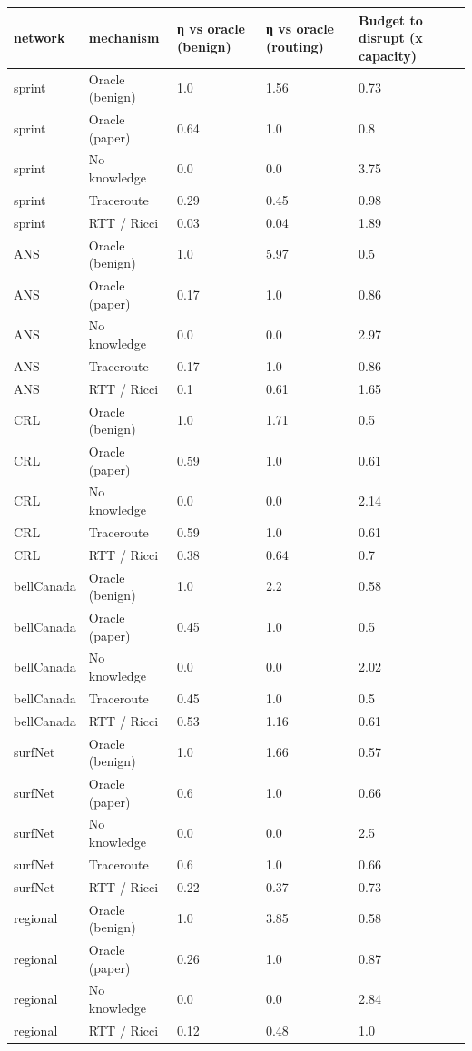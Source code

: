 \begin{tabular}{lllll}
\toprule
network & mechanism & η vs oracle (benign) & η vs oracle (routing) & Budget to disrupt (x capacity) \\
\midrule
sprint & Oracle (benign) & 1.0 & 1.56 & 0.73 \\
sprint & Oracle (paper) & 0.64 & 1.0 & 0.8 \\
sprint & No knowledge & 0.0 & 0.0 & 3.75 \\
sprint & Traceroute & 0.29 & 0.45 & 0.98 \\
sprint & RTT / Ricci & 0.03 & 0.04 & 1.89 \\
ANS & Oracle (benign) & 1.0 & 5.97 & 0.5 \\
ANS & Oracle (paper) & 0.17 & 1.0 & 0.86 \\
ANS & No knowledge & 0.0 & 0.0 & 2.97 \\
ANS & Traceroute & 0.17 & 1.0 & 0.86 \\
ANS & RTT / Ricci & 0.1 & 0.61 & 1.65 \\
CRL & Oracle (benign) & 1.0 & 1.71 & 0.5 \\
CRL & Oracle (paper) & 0.59 & 1.0 & 0.61 \\
CRL & No knowledge & 0.0 & 0.0 & 2.14 \\
CRL & Traceroute & 0.59 & 1.0 & 0.61 \\
CRL & RTT / Ricci & 0.38 & 0.64 & 0.7 \\
bellCanada & Oracle (benign) & 1.0 & 2.2 & 0.58 \\
bellCanada & Oracle (paper) & 0.45 & 1.0 & 0.5 \\
bellCanada & No knowledge & 0.0 & 0.0 & 2.02 \\
bellCanada & Traceroute & 0.45 & 1.0 & 0.5 \\
bellCanada & RTT / Ricci & 0.53 & 1.16 & 0.61 \\
surfNet & Oracle (benign) & 1.0 & 1.66 & 0.57 \\
surfNet & Oracle (paper) & 0.6 & 1.0 & 0.66 \\
surfNet & No knowledge & 0.0 & 0.0 & 2.5 \\
surfNet & Traceroute & 0.6 & 1.0 & 0.66 \\
surfNet & RTT / Ricci & 0.22 & 0.37 & 0.73 \\
regional & Oracle (benign) & 1.0 & 3.85 & 0.58 \\
regional & Oracle (paper) & 0.26 & 1.0 & 0.87 \\
regional & No knowledge & 0.0 & 0.0 & 2.84 \\
regional & RTT / Ricci & 0.12 & 0.48 & 1.0 \\
\bottomrule
\end{tabular}
